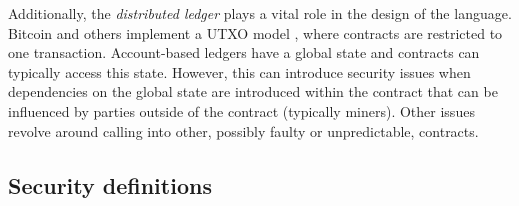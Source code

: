 Additionally, the \emph{distributed ledger} plays a vital role in the design of the language. Bitcoin and others implement a UTXO model \cite{Nakamoto2008,Covaci2018}, where contracts are restricted to one transaction. Account-based ledgers have a global state and contracts can typically access this state. 
However, this can introduce security issues when dependencies on the global state are introduced within the contract that can be influenced by parties outside of the contract (typically miners). Other issues revolve around calling into other, possibly faulty or unpredictable, contracts.



\subsection{Security definitions}


%
%
%
